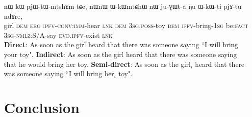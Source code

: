 \documentclass[oldfontcommands,oneside,a4paper,11pt]{article}
\newcommand{\ipa}[1]{{\phon \mbox{#1}}} %
\begin{document}
 
\begin{exe}
\ex
\gll   \ipa{tɤɕime}  	\ipa{nɯ}  	\ipa{kɯ}  	\ipa{pjɯ-tɯ-mtshɤm}  	\ipa{tɕe,}  	\ipa{nɯnɯ}  {\ipa{ɯ-kɯmtɕhɯ}}  	\ipa{nɯ}  	{\ipa{ju-ɣɯt-a}}  	\ipa{ŋu}  		\ipa{ɯ-kɯ-ti}  	\ipa{pjɤ-tu}  	\ipa{ndɤre,}  \\
girl \textsc{dem} \textsc{erg} \textsc{ipfv-conv:imm}-hear \textsc{lnk} \textsc{dem} {\textsc{3sg.poss}-toy} \textsc{dem} {\textsc{ipfv}-bring-\textsc{1sg}}  be:\textsc{fact} \textsc{3sg-nmlz}:S/A-say \textsc{evd.ipfv}-exist \textsc{lnk} \\
\glt   \textbf{Direct}: As soon as the girl heard that there was someone saying ``{I will bring} {your toy}".
\glt   \textbf{Indirect}:  As soon as the girl heard that there was someone saying that he would bring {her toy}.
\glt   \textbf{Semi-direct}: As soon as the girl$_i$ heard that there was someone saying ``{I will bring} {her$_i$ toy}".

  \end{exe}
  

  
 
\section{Conclusion}


\end{document}

